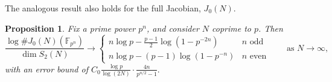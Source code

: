 \documentclass[11pt,letterpaper,reqno]{amsart}
\newtheorem{proposition}[theorem]{Proposition}
\theoremstyle{definition}
\numberwithin{equation}{section}
\numberwithin{figure}{section}
\numberwithin{table}{section}
\newcommand{\nw}{\mathrm{new}}
\begin{document}

The analogous result also holds for the full Jacobian, $J_0(N).$

\begin{proposition}\label{prop:asymptotic-point-count-Jacobianreg-q}
    Fix a prime power $p^n$, and consider $N$ coprime to $p$. Then
\[
\frac{\log \#J_0(N)(\mathbb F_{p^n})}
     {\dim S_2(N)}
\longrightarrow
\begin{cases}
\displaystyle n\log p - \frac{p-1}{2}\log\!\left(1-p^{-2n}\right)
& \text{$n$ odd}\\[10pt]
\displaystyle n\log p - (p-1)\log\!\left(1- p^{-n}\right)
& \text{$n$ even}
\end{cases}
\qquad\text{as }N\to\infty,
\]
with an error bound of $C_0
\frac{\log p}
     {\log(2N)} \cdot \frac{4n}{p^{n/2} - 1}.$
\end{proposition}
\end{document}

